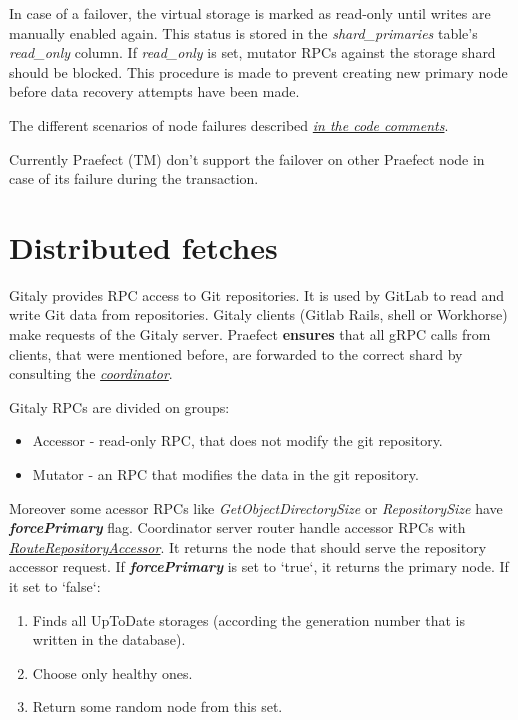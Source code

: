 \documentclass[acmlarge, screen, nonacm]{acmart}
\begin{document}
In case of a failover, the virtual storage is marked as read-only until writes are manually enabled
again. This status is stored in the \textit{shard\_primaries} table's \textit{read\_only }column. 
If \textit{read\_only } is set, mutator RPCs against the storage shard should be blocked. This procedure is made 
to prevent creating new primary node before data recovery attempts have been made.

The different scenarios of node failures described \emph{\href{https://gitlab.com/gitlab-org/gitaly/-/blob/master/internal/praefect/nodes/sql_elector.go\#L401}{in the code comments}}.

Currently Praefect (TM) don't support the failover on other Praefect node in case of its failure during the transaction.

\section{Distributed fetches}
Gitaly provides RPC access to Git repositories. It is used by GitLab to read and write Git data from repositories.
Gitaly clients (Gitlab Rails, shell or Workhorse) make requests of the Gitaly server.  Praefect \textbf{ensures} 
that all gRPC calls from clients, that were mentioned before, are forwarded to the correct shard by consulting the
\emph{\href{https://gitlab.com/gitlab-org/gitaly/-/blob/master/internal/praefect/coordinator.go}{coordinator}}.

Gitaly RPCs are divided on groups:
\begin{itemize}
\item Accessor - read-only RPC, that does not modify the git repository.
\item Mutator - an RPC that modifies the data in the git repository.
\end{itemize}

Moreover some acessor RPCs like \textit{GetObjectDirectorySize} or \textit{RepositorySize} have \textbf{\textit{forcePrimary}} flag. 
Coordinator server router handle accessor RPCs with  
\emph{\href{https://gitlab.com/gitlab-org/gitaly/-/blob/master/internal/praefect/coordinator.go\#L356}{ RouteRepositoryAccessor}}. 
It returns the node that should serve the repository accessor request. If \textbf{\textit{forcePrimary }} is set to `true`, it returns the primary node. 
If it set to `false`: 
\begin{enumerate}
\item Finds all UpToDate storages (according the generation number that is written in the database).
\item Choose only healthy ones.
\item Return some random node from this set.
\end{enumerate}
\end{document}
